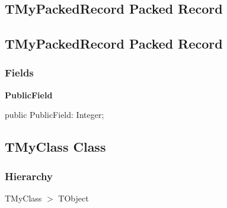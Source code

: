 \documentclass{report}
\newif\ifpdf
\begin{document}
\subsection*{\large{\textbf{TMyPackedRecord Packed Record}}\normalsize\hspace{1ex}\hrulefill}
\else
\subsection*{TMyPackedRecord Packed Record}
\fi
\label{ok_interface_implicit.TMyPackedRecord}
\subsubsection*{\large{\textbf{Fields}}\normalsize\hspace{1ex}\hfill}
\begin{list}{}{
\setlength{\itemindent}{0cm}
\setlength{\listparindent}{0cm}
\setlength{\leftmargin}{\evensidemargin}
\addtolength{\leftmargin}{\tmplength}
\settowidth{\labelsep}{X}
\addtolength{\leftmargin}{\labelsep}
\setlength{\labelwidth}{\tmplength}
}
\label{ok_interface_implicit.TMyPackedRecord-PublicField}
\item[\textbf{PublicField}\hfill]
\ifpdf
\begin{flushleft}
\fi
\begin{ttfamily}
public PublicField: Integer;\end{ttfamily}

\ifpdf
\end{flushleft}
\fi


\par  \end{list}
\ifpdf
\subsection*{\large{\textbf{TMyClass Class}}\normalsize\hspace{1ex}\hrulefill}
\else
\subsection*{TMyClass Class}
\fi
\label{ok_interface_implicit.TMyClass}
\subsubsection*{\large{\textbf{Hierarchy}}\normalsize\hspace{1ex}\hfill}
TMyClass {$>$} TObject
\end{document}
